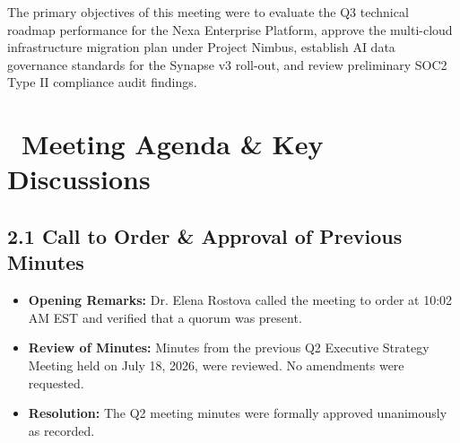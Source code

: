 \documentclass[11pt,a4paper]{article}
\begin{document}
\vspace{0.15cm}

\begin{tcolorbox}[
    enhanced,
    colback=BlueBg,
    colframe=BlueTag,
    arc=3pt,
    boxrule=0.8pt,
    title={\small\bfseries\faInfoCircle\ Executive Meeting Objective},
    coltitle=white,
    top=5pt, bottom=5pt
]
    \small
    The primary objectives of this meeting were to evaluate the Q3 technical roadmap performance for the Nexa Enterprise Platform, approve the multi-cloud infrastructure migration plan under Project Nimbus, establish AI data governance standards for the Synapse v3 roll-out, and review preliminary SOC2 Type II compliance audit findings.
\end{tcolorbox}

\vspace{0.15cm}

\section{\texorpdfstring{\faListOl\ Meeting Agenda \& Key Discussions}{2. Meeting Agenda \& Key Discussions}}

\subsection{2.1 Call to Order \& Approval of Previous Minutes}
\begin{itemize}[leftmargin=15pt, itemsep=2.5pt]
    \item \textbf{Opening Remarks:} Dr. Elena Rostova called the meeting to order at 10:02 AM EST and verified that a quorum was present.
    \item \textbf{Review of Minutes:} Minutes from the previous Q2 Executive Strategy Meeting held on July 18, 2026, were reviewed. No amendments were requested.
    \item \textbf{Resolution:} The Q2 meeting minutes were formally approved unanimously as recorded.
\end{itemize}
\end{document}
